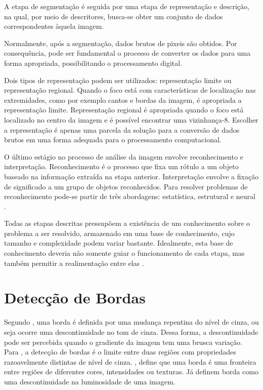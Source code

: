 A etapa de segmentação é seguida por uma etapa de representação e descrição, na qual, por meio de descritores, busca-se obter um conjunto de dados correspondentes àquela imagem.

Normalmente, após a segmentação, dados brutos de pixeis são obtidos. Por consequência, pode ser fundamental o processo de converter os dados para uma forma apropriada, possibilitando o processamento digital. 

Dois tipos de representação podem ser utilizados: representação limite ou representação regional. Quando o foco está com características de localização nas extremidades, como por exemplo cantos e bordas da imagem, é apropriada a representação limite. Representação regional é apropriada quando o foco está localizado no centro da imagem e é possível encontrar uma vizinhança-8. Escolher a representação é apenas uma parcela da solução para a conversão de dados brutos em uma forma adequada para o processamento computacional. \cite{Rodrigues2002}

O último estágio no processo de análise da imagem envolve reconhecimento e interpretação. Reconhecimento é o processo que fixa um rótulo a um objeto baseado na informação extraída na etapa anterior. Interpretação envolve a fixação de significado a um grupo de objetos reconhecidos. Para resolver problemas de reconhecimento pode-se partir de três abordagens: estatística, estrutural e neural \cite{GONZALEZ1992}.

Todas as etapas descritas pressupõem a existência de um conhecimento sobre o problema a ser resolvido, armazenado em uma base de conhecimento, cujo tamanho e complexidade podem variar bastante. Idealmente, esta base de conhecimento deveria não somente guiar o funcionamento de cada etapa, mas também permitir a realimentação entre elas \cite{marques1999}.


\section{Detecção de Bordas}

Segundo , uma borda é definida por uma mudança repentina do nível de cinza, ou seja ocorre uma descontinuidade no tom de cinza. Dessa forma, a descontinuidade pode ser percebida quando o gradiente da imagem tem uma brusca variação. Para , a detecção de bordas é o limite entre duas regiões com propriedades razoavelmente distintas de nível de cinza. , define que uma borda é uma fronteira entre regiões de diferentes cores, intensidades ou texturas. Já  definem borda como uma descontinuidade na luminosidade de uma imagem.

